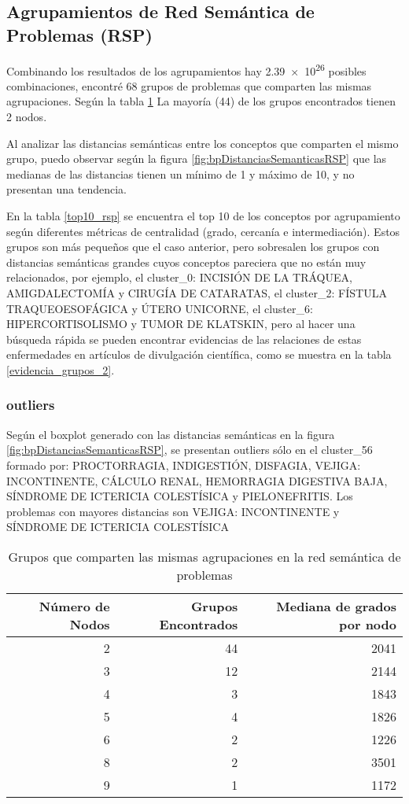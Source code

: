 \subsection{Agrupamientos de Red Semántica de Problemas (RSP)}
Combinando los resultados de los agrupamientos hay \num{2,39e26} posibles combinaciones, encontré 68 grupos de problemas que comparten las mismas agrupaciones. Según la tabla \ref{gruposRSP} La mayoría (44) de los grupos encontrados tienen 2 nodos.

Al analizar las distancias semánticas entre los conceptos que comparten el mismo grupo, puedo observar según la figura \ref{fig:bpDistanciasSemanticasRSP} que las medianas de las distancias tienen un mínimo de 1 y máximo de 10, y no presentan una tendencia. 

En la tabla \ref{top10_rsp} se encuentra el top 10 de los conceptos por agrupamiento según diferentes métricas de centralidad (grado, cercanía e intermediación). Estos grupos son más pequeños que el caso anterior, pero sobresalen los grupos con distancias semánticas grandes cuyos conceptos pareciera que no están muy relacionados, por ejemplo, el cluster\_0: INCISIÓN DE LA TRÁQUEA, AMIGDALECTOMÍA y CIRUGÍA DE CATARATAS, el cluster\_2: FÍSTULA TRAQUEOESOFÁGICA y ÚTERO UNICORNE, el cluster\_6: HIPERCORTISOLISMO y TUMOR DE KLATSKIN, pero al hacer una búsqueda rápida se pueden encontrar evidencias de las relaciones de estas enfermedades en artículos de divulgación científica, como se muestra en la tabla \ref{evidencia_grupos_2}.

\subsubsection{outliers}
Según el boxplot generado con las distancias semánticas en la figura \ref{fig:bpDistanciasSemanticasRSP}, se presentan outliers sólo en el cluster\_56 formado por: PROCTORRAGIA, INDIGESTIÓN, DISFAGIA, VEJIGA: INCONTINENTE, CÁLCULO RENAL, HEMORRAGIA DIGESTIVA BAJA, SÍNDROME DE ICTERICIA COLESTÍSICA y PIELONEFRITIS. Los problemas con mayores distancias son VEJIGA: INCONTINENTE y SÍNDROME DE ICTERICIA COLESTÍSICA


\begin{table}[htb]
\centering
\caption{Grupos que comparten las mismas agrupaciones en la red semántica de problemas}
\label{gruposRSP}
\begin{tabular}{@{}rrr@{}}
\toprule
Número de Nodos & Grupos Encontrados & Mediana de grados por nodo \\ \midrule
2	& 44	&2041 \\
3	&12 &	2144\\
4	&3&	1843\\
5	&4&	1826\\
6	&2&	1226\\
8	&2&	3501\\
9	&1&	1172                   \\ \bottomrule
\end{tabular}
\end{table}

